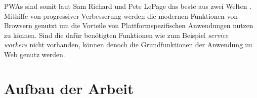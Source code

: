 PWAs sind somit laut Sam Richard und Pete LePage das beste aus zwei Welten \cite{SamRichard2020}. Mithilfe von progressiver Verbesserung werden die modernen Funktionen von Browsern genutzt um die Vorteile von Plattformspezifischen Anwendungen nutzen zu können. Sind die dafür benötigten Funktionen wie zum Beispiel \textit{service workers} nicht vorhanden, können denoch die Grundfunktionen der Anwendung im Web genutz werden. 

\section{Aufbau der Arbeit}